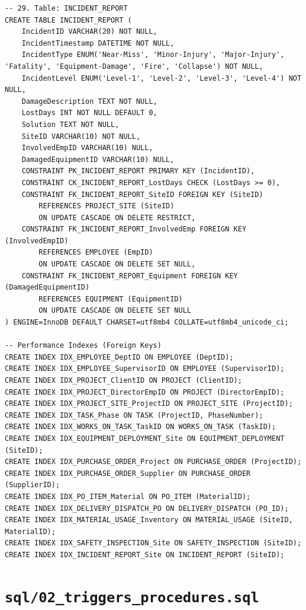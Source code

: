 \documentclass[a4paper,12pt]{report}
\begin{document}
\begin{lstlisting}
-- 29. Table: INCIDENT_REPORT
CREATE TABLE INCIDENT_REPORT (
    IncidentID VARCHAR(20) NOT NULL,
    IncidentTimestamp DATETIME NOT NULL,
    IncidentType ENUM('Near-Miss', 'Minor-Injury', 'Major-Injury', 'Fatality', 'Equipment-Damage', 'Fire', 'Collapse') NOT NULL,
    IncidentLevel ENUM('Level-1', 'Level-2', 'Level-3', 'Level-4') NOT NULL,
    DamageDescription TEXT NOT NULL,
    LostDays INT NOT NULL DEFAULT 0,
    Solution TEXT NOT NULL,
    SiteID VARCHAR(10) NOT NULL,
    InvolvedEmpID VARCHAR(10) NULL,
    DamagedEquipmentID VARCHAR(10) NULL,
    CONSTRAINT PK_INCIDENT_REPORT PRIMARY KEY (IncidentID),
    CONSTRAINT CK_INCIDENT_REPORT_LostDays CHECK (LostDays >= 0),
    CONSTRAINT FK_INCIDENT_REPORT_SiteID FOREIGN KEY (SiteID)
        REFERENCES PROJECT_SITE (SiteID)
        ON UPDATE CASCADE ON DELETE RESTRICT,
    CONSTRAINT FK_INCIDENT_REPORT_InvolvedEmp FOREIGN KEY (InvolvedEmpID)
        REFERENCES EMPLOYEE (EmpID)
        ON UPDATE CASCADE ON DELETE SET NULL,
    CONSTRAINT FK_INCIDENT_REPORT_Equipment FOREIGN KEY (DamagedEquipmentID)
        REFERENCES EQUIPMENT (EquipmentID)
        ON UPDATE CASCADE ON DELETE SET NULL
) ENGINE=InnoDB DEFAULT CHARSET=utf8mb4 COLLATE=utf8mb4_unicode_ci;

-- Performance Indexes (Foreign Keys)
CREATE INDEX IDX_EMPLOYEE_DeptID ON EMPLOYEE (DeptID);
CREATE INDEX IDX_EMPLOYEE_SupervisorID ON EMPLOYEE (SupervisorID);
CREATE INDEX IDX_PROJECT_ClientID ON PROJECT (ClientID);
CREATE INDEX IDX_PROJECT_DirectorEmpID ON PROJECT (DirectorEmpID);
CREATE INDEX IDX_PROJECT_SITE_ProjectID ON PROJECT_SITE (ProjectID);
CREATE INDEX IDX_TASK_Phase ON TASK (ProjectID, PhaseNumber);
CREATE INDEX IDX_WORKS_ON_TASK_TaskID ON WORKS_ON_TASK (TaskID);
CREATE INDEX IDX_EQUIPMENT_DEPLOYMENT_Site ON EQUIPMENT_DEPLOYMENT (SiteID);
CREATE INDEX IDX_PURCHASE_ORDER_Project ON PURCHASE_ORDER (ProjectID);
CREATE INDEX IDX_PURCHASE_ORDER_Supplier ON PURCHASE_ORDER (SupplierID);
CREATE INDEX IDX_PO_ITEM_Material ON PO_ITEM (MaterialID);
CREATE INDEX IDX_DELIVERY_DISPATCH_PO ON DELIVERY_DISPATCH (PO_ID);
CREATE INDEX IDX_MATERIAL_USAGE_Inventory ON MATERIAL_USAGE (SiteID, MaterialID);
CREATE INDEX IDX_SAFETY_INSPECTION_Site ON SAFETY_INSPECTION (SiteID);
CREATE INDEX IDX_INCIDENT_REPORT_Site ON INCIDENT_REPORT (SiteID);
\end{lstlisting}

\section{\texorpdfstring{\texttt{sql/02\_\allowbreak{}triggers\_\allowbreak{}procedures.\allowbreak{}sql}}{sql/02triggersprocedures.sql}}\label{a.2-sql02_triggers_procedures.sql}
\end{document}
